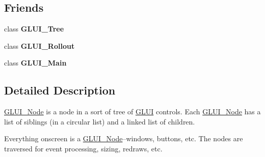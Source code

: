 \subsection*{Friends}
\begin{DoxyCompactItemize}
\item 
\hypertarget{class_g_l_u_i___node_a5cd4411266c4ef47da626d8efdf1138e}{class {\bfseries G\+L\+U\+I\+\_\+\+Tree}}\label{class_g_l_u_i___node_a5cd4411266c4ef47da626d8efdf1138e}

\item 
\hypertarget{class_g_l_u_i___node_a342e7f489f8666a8156fb18bd0ea0d2e}{class {\bfseries G\+L\+U\+I\+\_\+\+Rollout}}\label{class_g_l_u_i___node_a342e7f489f8666a8156fb18bd0ea0d2e}

\item 
\hypertarget{class_g_l_u_i___node_a97e15a1bec3e5f03f25594cb1d690fee}{class {\bfseries G\+L\+U\+I\+\_\+\+Main}}\label{class_g_l_u_i___node_a97e15a1bec3e5f03f25594cb1d690fee}

\end{DoxyCompactItemize}


\subsection{Detailed Description}
\hyperlink{class_g_l_u_i___node}{G\+L\+U\+I\+\_\+\+Node} is a node in a sort of tree of \hyperlink{class_g_l_u_i}{G\+L\+U\+I} controls. Each \hyperlink{class_g_l_u_i___node}{G\+L\+U\+I\+\_\+\+Node} has a list of siblings (in a circular list) and a linked list of children.

Everything onscreen is a \hyperlink{class_g_l_u_i___node}{G\+L\+U\+I\+\_\+\+Node}--windows, buttons, etc. The nodes are traversed for event processing, sizing, redraws, etc. 

